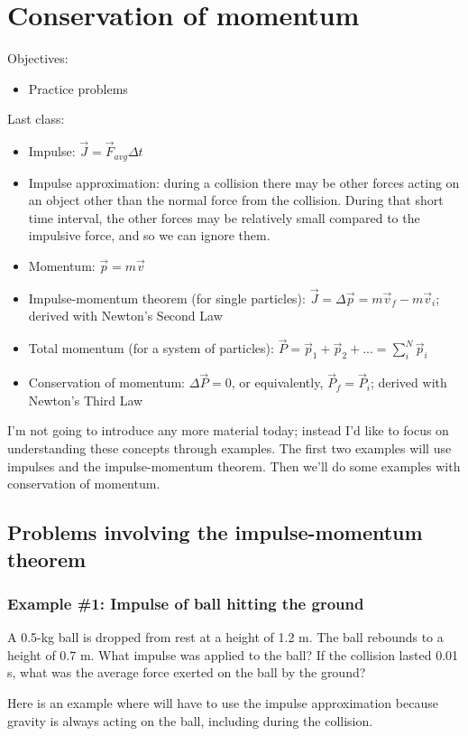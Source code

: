 \section{Conservation of momentum}
Objectives:
\begin{itemize}
\item Practice problems
\end{itemize}

Last class:
\begin{itemize}
\item Impulse: $\vec{J}=\vec{F}_{avg}\Delta{t}$
\item Impulse approximation: during a collision there may be other forces acting on an object other than the normal force from the collision. During that short time interval, the other forces may be relatively small compared to the impulsive force, and so we can ignore them. 
\item Momentum: $\vec{p}=m\vec{v}$
\item Impulse-momentum theorem (for single particles): $\vec{J}=\Delta{\vec{p}}=m\vec{v}_f-m\vec{v}_i$; derived with Newton's Second Law
\item Total momentum (for a system of particles): $\vec{P}=\vec{p}_1+\vec{p}_2+...=\displaystyle\sum_i^N \vec{p}_i$
\item Conservation of momentum: $\Delta{\vec{P}}=0$, or equivalently, $\vec{P}_f=\vec{P}_i$; derived with Newton's Third Law
\end{itemize}

I'm not going to introduce any more material today; instead I'd like to focus on understanding these concepts through examples. The first two examples will use impulses and the impulse-momentum theorem. Then we'll do some examples with conservation of momentum.

\subsection{Problems involving the impulse-momentum theorem}
\subsubsection*{Example \#1: Impulse of ball hitting the ground}
A 0.5-kg ball is dropped from rest at a height of 1.2 m. The ball rebounds to a height of 0.7 m. What impulse was applied to the ball? If the collision lasted 0.01 s, what was the average force exerted on the ball by the ground?

Here is an example where will have to use the impulse approximation because gravity is always acting on the ball, including during the collision.

